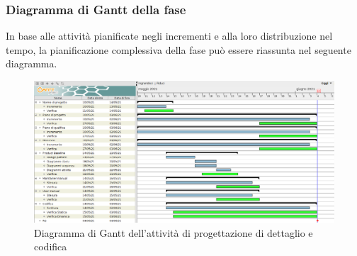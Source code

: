 \subsubsection{Diagramma di Gantt della fase}
In base alle attività pianificate negli incrementi e alla loro distribuzione nel tempo, la pianificazione complessiva della fase può essere riassunta nel seguente diagramma.
\begin{figure}[!ht]
    \caption{Diagramma di Gantt dell'attività di progettazione di dettaglio e codifica}
    \vspace{5px}
    \includegraphics[scale=0.22]{../../../Images/Diagrammi/Gantt/progettazioneCodifica_v3.png}
    \centering
\end{figure}

